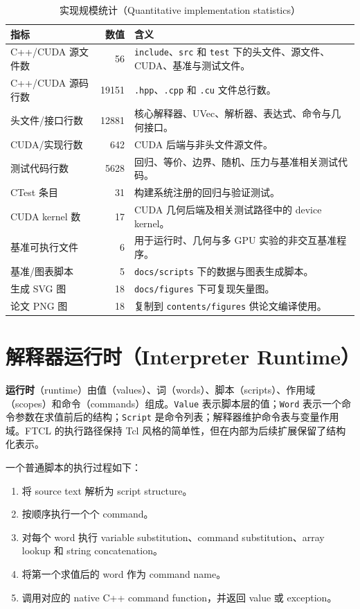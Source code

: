\begin{table}[htbp]
\centering
\caption{实现规模统计（Quantitative implementation statistics）}
\label{tab:implementation-statistics}
\small
\begin{tabularx}{\textwidth}{lrX}
\toprule
指标 & 数值 & 含义 \\
\midrule
C++/CUDA 源文件数 & 56 & \texttt{include}、\texttt{src} 和 \texttt{test} 下的头文件、源文件、CUDA、基准与测试文件。 \\
C++/CUDA 源码行数 & 19151 & \texttt{.hpp}、\texttt{.cpp} 和 \texttt{.cu} 文件总行数。 \\
头文件/接口行数 & 12881 & 核心解释器、UVec、解析器、表达式、命令与几何接口。 \\
CUDA/实现行数 & 642 & CUDA 后端与非头文件源文件。 \\
测试代码行数 & 5628 & 回归、等价、边界、随机、压力与基准相关测试代码。 \\
CTest 条目 & 31 & 构建系统注册的回归与验证测试。 \\
CUDA kernel 数 & 17 & CUDA 几何后端及相关测试路径中的 device kernel。 \\
基准可执行文件 & 6 & 用于运行时、几何与多 GPU 实验的非交互基准程序。 \\
基准/图表脚本 & 5 & \texttt{docs/scripts} 下的数据与图表生成脚本。 \\
生成 SVG 图 & 18 & \texttt{docs/figures} 下可复现矢量图。 \\
论文 PNG 图 & 18 & 复制到 \texttt{contents/figures} 供论文编译使用。 \\
\bottomrule
\end{tabularx}
\end{table}

\section{解释器运行时（Interpreter Runtime）}
\textbf{运行时}（runtime）由值（values）、词（words）、脚本（scripts）、作用域（scopes）和命令（commands）组成。\texttt{Value} 表示脚本层的值；\texttt{Word} 表示一个命令参数在求值前后的结构；\texttt{Script} 是命令列表；解释器维护命令表与变量作用域。FTCL 的执行路径保持 Tcl 风格的简单性，但在内部为后续扩展保留了结构化表示。

一个普通脚本的执行过程如下：

\begin{enumerate}
  \item 将 source text 解析为 script structure。
  \item 按顺序执行一个个 command。
  \item 对每个 word 执行 variable substitution、command substitution、array lookup 和 string concatenation。
  \item 将第一个求值后的 word 作为 command name。
  \item 调用对应的 native C++ command function，并返回 value 或 exception。
\end{enumerate}

